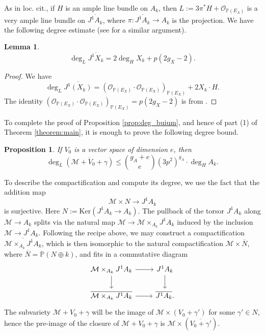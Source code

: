 \documentclass[11pt]{amsart}
\newcommand{\Ker}{\mathrm{Ker}}
\theoremstyle{plain}
\newtheorem{lemma}{Lemma}
\newtheorem{proposition}{Proposition}
\theoremstyle{definition}
\begin{document}
As in loc. cit., if $H$ is an ample line bundle on $A_k$, then $L:=3\pi ^* H+\mathcal{O}_{\mathbb{P}(E_A)}$ is a very ample line bundle on $\overline{J^1 A_k }$, where $\pi :\overline{J^1 A_k }\to A_k$ is the projection. We have the following degree estimate (see \cite[proof of Theorem 1.11]{buium:96} for a similar argument).
\begin{lemma}\label{lemma:easy_bd}
\[
\deg _L \overline{J^1 X_k} =2\deg _H X_k +p(2g_X -2).
\]
\end{lemma}
\begin{proof}
We have 
\[
\deg _L \overline{J^1 (X_k )} = (\mathcal{O}_{\mathbb{P}(E_X )}\cdot \mathcal{O}_{\mathbb{P}(E_X )})_{\mathbb{P}(E_X )} +2 X_k \cdot H. 
\]
The identity $(\mathcal{O}_{\mathbb{P}(E_X )}\cdot \mathcal{O}_{\mathbb{P}(E_X )})_{\mathbb{P}(E_X )} =p(2g_X -2)$ is from \cite{buium:96}.
\end{proof}
To complete the proof of Proposition \ref{prop:deg_buium}, and hence of part (1) of Theorem \ref{theorem:main}, it is enough to prove the following degree bound.
\begin{proposition}\label{prop:deg_bd}
If $V_0 $ is a vector space of dimension $e$, then
\[
\deg _L (\overline{\mathcal{M}+V_0 +\gamma })\leq \binom{g_A+e}{e}(3p^2 )^{g_A} \cdot \deg _H A_k .
\]
\end{proposition}

To describe the compactification and compute its degree, we use the fact that the addition map
\[
\mathcal{M}\times N\to J^1 A_k 
\]
is surjective. Here $N:=\Ker (J^1 A_k \to A_k )$. The pullback of the torsor $J^1 A_k $ along $\mathcal{M}\to A_k $ splits via the natural map $\mathcal{M}\to \mathcal{M}\times _{A_k }J^1 A_k $ induced by the inclusion $\mathcal{M}\to J^1 A_k $. Following the recipe above, we may construct a compactification $\overline{\mathcal{M}\times _{A_k }J^1 A_k }$, which is then isomorphic to the natural compactification $\mathcal{M}\times \overline{N}$, where $\overline{N}=\mathbb{P}(N\oplus k)$, and fits in a commutative diagram
\[
\begin{tikzcd}
\mathcal{M}\times _{A_k }J^1 A_k  \arrow[d] \arrow[r] & J^1 A_k \arrow[d] \\
\overline{\mathcal{M}\times _{A_k }J^1 A_k } \arrow[r]           & \overline{J^1 A_k }.
\end{tikzcd}
\]
The subvariety $\mathcal{M}+V_0 +\gamma $ will be the image of $\mathcal{M}\times (V_0 +\gamma ')$ for some $\gamma ' \in N$, hence the pre-image of the closure of $\mathcal{M}+V_0 +\gamma $ is $\mathcal{M}\times (\overline{V_0 +\gamma '})$. 
\end{document}
